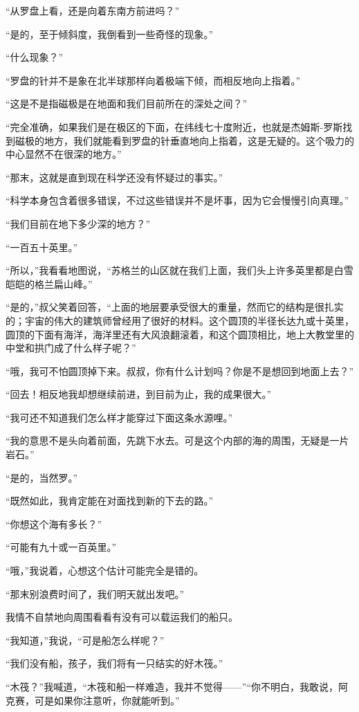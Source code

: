 \documentclass[10pt]{book}
\begin{document}
“从罗盘上看，还是向着东南方前进吗？”

“是的，至于倾斜度，我倒看到一些奇怪的现象。”

“什么现象？”

“罗盘的针并不是象在北半球那样向着极端下倾，而相反地向上指着。”

“这是不是指磁极是在地面和我们目前所在的深处之间？”

“完全准确，如果我们是在极区的下面，在纬线七十度附近，也就是杰姆斯-罗斯找到磁极的地方，我们就能看到罗盘的针垂直地向上指着，这是无疑的。这个吸力的中心显然不在很深的地方。”

“那末，这就是直到现在科学还没有怀疑过的事实。”

“科学本身包含着很多错误，不过这些错误并不是坏事，因为它会慢慢引向真理。”

“我们目前在地下多少深的地方？”

“一百五十英里。”

“所以，”我看看地图说，“苏格兰的山区就在我们上面，我们头上许多英里都是白雪皑皑的格兰扁山峰。”

“是的，”叔父笑着回答，“上面的地层要承受很大的重量，然而它的结构是很扎实的；宇宙的伟大的建筑师曾经用了很好的材料。这个圆顶的半径长达九或十英里，圆顶的下面有海洋，海洋里还有大风浪翻滚着，和这个圆顶相比，地上大教堂里的中堂和拱门成了什么样子呢？”

“哦，我可不怕圆顶掉下来。叔叔，你有什么计划吗？你是不是想回到地面上去？”

“回去！相反地我却想继续前进，到目前为止，我的成果很大。”

“我可还不知道我们怎么样才能穿过下面这条水源哩。”

“我的意思不是头向着前面，先跳下水去。可是这个内部的海的周围，无疑是一片岩石。”

“是的，当然罗。”

“既然如此，我肯定能在对面找到新的下去的路。”

“你想这个海有多长？”

“可能有九十或一百英里。”

“哦，”我说着，心想这个估计可能完全是错的。

“那末别浪费时间了，我们明天就出发吧。”

我情不自禁地向周围看看有没有可以载运我们的船只。

“我知道，”我说，“可是船怎么样呢？”

“我们没有船，孩子，我们将有一只结实的好木筏。”

“木筏？”我喊道，“木筏和船一样难造，我并不觉得——”“你不明白，我敢说，阿克赛，可是如果你注意听，你就能听到。”
\end{document}
